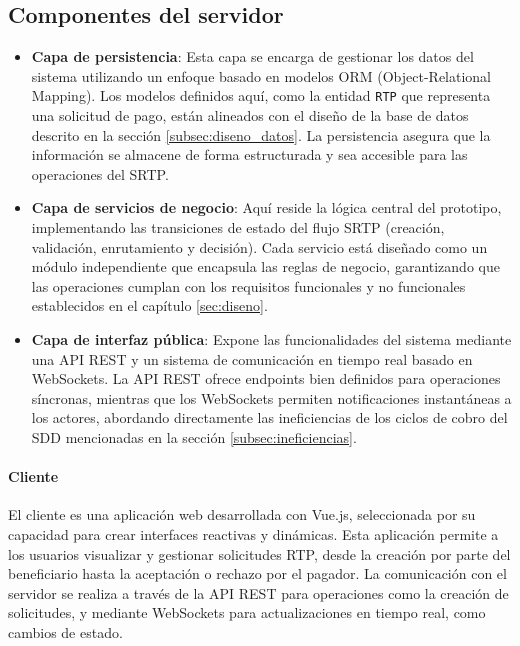 \subsection{Componentes del servidor}
\label{subsec:componentes-del.serv}
\begin{itemize}
    \item \textbf{Capa de persistencia}: Esta capa se encarga de gestionar los datos del sistema utilizando un enfoque basado en modelos ORM (Object-Relational Mapping). Los modelos definidos aquí, como la entidad \texttt{RTP} que representa una solicitud de pago, están alineados con el diseño de la base de datos descrito en la sección \ref{subsec:diseno_datos}. La persistencia asegura que la información se almacene de forma estructurada y sea accesible para las operaciones del SRTP.
    
    \item \textbf{Capa de servicios de negocio}: Aquí reside la lógica central del prototipo, implementando las transiciones de estado del flujo SRTP (creación, validación, enrutamiento y decisión). Cada servicio está diseñado como un módulo independiente que encapsula las reglas de negocio, garantizando que las operaciones cumplan con los requisitos funcionales y no funcionales establecidos en el capítulo \ref{sec:diseno}.
    
    \item \textbf{Capa de interfaz pública}: Expone las funcionalidades del sistema mediante una API REST y un sistema de comunicación en tiempo real basado en WebSockets. La API REST ofrece endpoints bien definidos para operaciones síncronas, mientras que los WebSockets permiten notificaciones instantáneas a los actores, abordando directamente las ineficiencias de los ciclos de cobro del SDD mencionadas en la sección \ref{subsec:ineficiencias}.
\end{itemize}

\paragraph{Cliente}

El cliente es una aplicación web desarrollada con Vue.js, seleccionada por su capacidad para crear interfaces reactivas y dinámicas. Esta aplicación permite a los usuarios visualizar y gestionar solicitudes RTP, desde la creación por parte del beneficiario hasta la aceptación o rechazo por el pagador. La comunicación con el servidor se realiza a través de la API REST para operaciones como la creación de solicitudes, y mediante WebSockets para actualizaciones en tiempo real, como cambios de estado.

